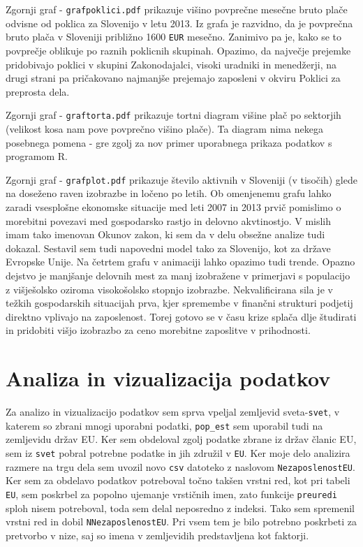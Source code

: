 \documentclass[11pt,a4paper]{article}
\begin{document}
Zgornji graf - \verb|grafpoklici.pdf| prikazuje višino povprečne mesečne bru\-to plače odvisne od poklica za Slovenijo v letu 2013. Iz grafa je razvidno, da je povprečna bruto plača v Sloveniji približno 1600 \verb|EUR| mesečno. Zanimivo pa je, kako se to povprečje oblikuje po raznih poklicnih skupinah. Opazimo, da največje prejemke pridobivajo poklici v skupini Zakonodajalci, visoki uradniki in menedžerji, na drugi strani pa pričakovano najmanjše prejemajo zaposleni v okviru Poklici za preprosta dela.

Zgornji graf - \verb|graftorta.pdf| prikazuje tortni diagram višine plač po sektorjih (velikost kosa nam pove povprečno višino plače). Ta diagram nima nekega posebnega pomena - gre zgolj za nov primer uporabnega prikaza podatkov s programom R.

Zgornji graf - \verb|grafplot.pdf| prikazuje šte\-vilo aktivnih v Sloveniji (v tisočih) glede na doseženo raven izobrazbe in ločeno po letih. Ob omenjenemu grafu lahko zaradi vsesplošne ekonomske situacije med leti 2007 in 2013 prvič pomislimo o morebitni povezavi med gospodarsko rastjo in delovno akvtinostjo. V mislih imam tako imenovan Okunov zakon, ki sem da v delu obsežne analize tudi dokazal. Sestavil sem tudi napovedni model tako za Slovenijo, kot za države Evropske Unije. Na četrtem grafu v animaciji lahko opazimo tudi trende. Opazno dejstvo je manjšanje delovnih mest za manj izobražene v primerjavi s populacijo z višješolsko oziroma visokošolsko stopnjo izobrazbe. Nekvalificirana sila je v težkih gospodarskih situacijah prva, kjer spremembe v finančni strukturi podjetij direktno vplivajo na zaposlenost. Torej gotovo se v času krize splača dlje študirati in pridobiti višjo izobrazbo za ceno morebitne zaposlitve v prihodnosti.

\pagebreak
\section{Analiza in vizualizacija podatkov}

Za analizo in vizualizacijo podatkov sem sprva vpeljal zemljevid sveta-\verb|svet|, v katerem so zbrani mnogi uporabni podatki, \verb|pop_est| sem uporabil tudi na zemljevidu držav EU. Ker sem obdeloval zgolj podatke zbrane iz držav članic EU, sem iz \verb|svet| pobral potrebne podatke in jih združil v \verb|EU|. Ker moje delo analizira razmere na trgu dela sem uvozil novo \verb|csv| datoteko z naslovom \verb|NezaposlenostEU|. Ker sem za obdelavo podatkov potreboval točno takšen vrstni red, kot pri tabeli \verb|EU|, sem poskrbel za popolno ujemanje vrstičnih imen, zato funkcije \verb|preuredi| sploh nisem potreboval, toda sem delal neposredno z indeksi. Tako sem spremenil vrstni red in dobil \verb|NNezaposlenostEU|. Pri vsem tem je bilo potrebno poskrbeti za pretvorbo v nize, saj so imena v zemljevidih predstavljena kot faktorji. 
\end{document}
